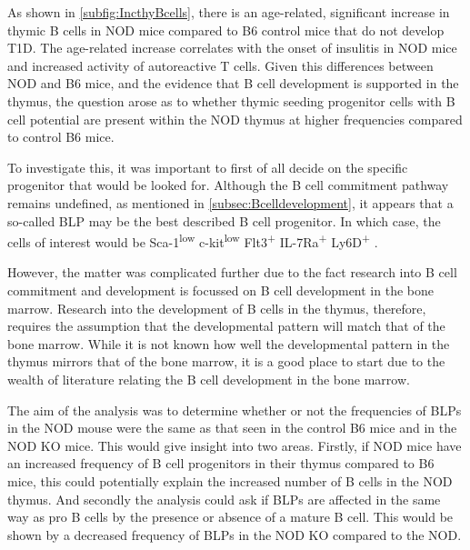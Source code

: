 
As shown in \cref{subfig:IncthyBcells}, there is an age-related, significant increase in thymic B cells in NOD mice compared to B6 control mice that do not develop T1D.
The age-related increase correlates with the onset of insulitis in NOD mice and increased activity of autoreactive T cells.
Given this differences between NOD and B6 mice, and the evidence that B cell development is supported in the thymus, the question arose as to whether thymic seeding progenitor cells with B cell potential are present within the NOD thymus at higher frequencies compared to control B6 mice.

To investigate this, it was important to first of all decide on the specific progenitor that would be looked for.
Although the B cell commitment pathway remains undefined, as mentioned in \cref{subsec:Bcelldevelopment}, it appears that a so-called BLP may be the best described B cell progenitor.
In which case, the cells of interest would be Sca-1\textsuperscript{low} c-kit\textsuperscript{low} Flt3\textsuperscript{+} IL-7Ra\textsuperscript{+} Ly6D\textsuperscript{+} \citep{Mansson2010, Inlay2009, Zhang2013}.

However, the matter was complicated further due to the fact research into B cell commitment and development is focussed on B cell development in the bone marrow.
Research into the development of B cells in the thymus, therefore, requires the assumption that the developmental pattern will match that of the bone marrow.
While it is not known how well the developmental pattern in the thymus mirrors that of the bone marrow, it is a good place to start due to the wealth of literature relating the B cell development in the bone marrow.

The aim of the analysis was to determine whether or not the frequencies of BLPs in the NOD mouse were the same as that seen in the control B6 mice and in the NOD KO mice.
This would give insight into two areas.
Firstly, if NOD mice have an increased frequency of B cell progenitors in their thymus compared to B6 mice, this could potentially explain the increased number of B cells in the NOD thymus.
And secondly the analysis could ask if BLPs are affected in the same way as pro B cells by the presence or absence of a mature B cell.
This would be shown by a decreased frequency of BLPs in the NOD KO compared to the NOD.

